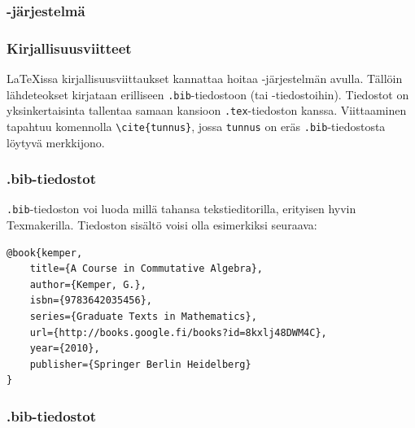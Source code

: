 \subsubsection{\BibTeX-järjestelmä}
\begin{frame}[fragile]
    \frametitle{Kirjallisuusviitteet}
    \LaTeX issa kirjallisuusviittaukset kannattaa hoitaa \BibTeX-järjestelmän avulla. 
    \vaihto
    Tällöin lähdeteokset kirjataan erilliseen \verb-.bib--tiedostoon (tai -tiedostoihin).
    \vaihto
    Tiedostot on yksinkertaisinta tallentaa samaan kansioon \verb-.tex--tiedoston kanssa.
    \vaihto
    Viittaaminen tapahtuu komennolla \verb-\cite{tunnus}-, jossa \verb-tunnus- on eräs \verb-.bib--tiedostosta löytyvä merkkijono.
\end{frame}
\begin{frame}[fragile]
    \frametitle{.bib-tiedostot}
    \verb-.bib--tiedoston voi luoda millä tahansa tekstieditorilla, erityisen hyvin Texmakerilla. 
    \vaihto
    Tiedoston sisältö voisi olla esimerkiksi seuraava:\vaihto
    \begin{scriptsize}
        \begin{Verbatim}[frame=single]
@book{kemper,
    title={A Course in Commutative Algebra},
    author={Kemper, G.},
    isbn={9783642035456},
    series={Graduate Texts in Mathematics},
    url={http://books.google.fi/books?id=8kxlj48DWM4C},
    year={2010},
    publisher={Springer Berlin Heidelberg}
}
        \end{Verbatim}
    \end{scriptsize}
\end{frame}
\begin{frame}[fragile]
    \frametitle{.bib-tiedostot}
    
\end{frame}

